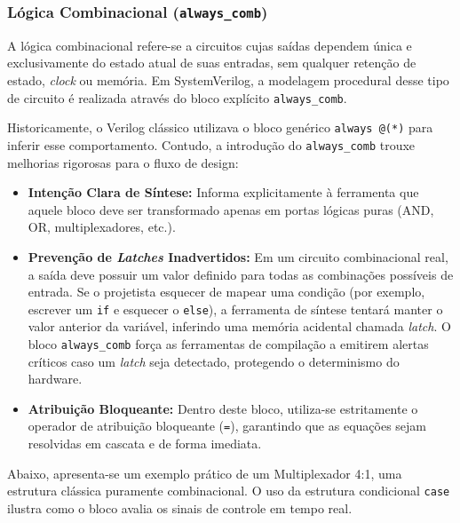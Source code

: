 \documentclass[12pt,a4paper]{article}
\begin{document}
\subsubsection{Lógica Combinacional (\texttt{always\_comb})}

A lógica combinacional refere-se a circuitos cujas saídas dependem única e exclusivamente do estado atual de suas entradas, sem qualquer retenção de estado, \textit{clock} ou memória. Em SystemVerilog, a modelagem procedural desse tipo de circuito é realizada através do bloco explícito \texttt{always\_comb}.

Historicamente, o Verilog clássico utilizava o bloco genérico \texttt{always @(*)} para inferir esse comportamento. Contudo, a introdução do \texttt{always\_comb} trouxe melhorias rigorosas para o fluxo de design:

\begin{itemize}
    \item \textbf{Intenção Clara de Síntese:} Informa explicitamente à ferramenta que aquele bloco deve ser transformado apenas em portas lógicas puras (AND, OR, multiplexadores, etc.).
    \item \textbf{Prevenção de \textit{Latches} Inadvertidos:} Em um circuito combinacional real, a saída deve possuir um valor definido para todas as combinações possíveis de entrada. Se o projetista esquecer de mapear uma condição (por exemplo, escrever um \texttt{if} e esquecer o \texttt{else}), a ferramenta de síntese tentará manter o valor anterior da variável, inferindo uma memória acidental chamada \textit{latch}. O bloco \texttt{always\_comb} força as ferramentas de compilação a emitirem alertas críticos caso um \textit{latch} seja detectado, protegendo o determinismo do hardware.
    \item \textbf{Atribuição Bloqueante:} Dentro deste bloco, utiliza-se estritamente o operador de atribuição bloqueante (\texttt{=}), garantindo que as equações sejam resolvidas em cascata e de forma imediata.
\end{itemize}

Abaixo, apresenta-se um exemplo prático de um Multiplexador 4:1, uma estrutura clássica puramente combinacional. O uso da estrutura condicional \texttt{case} ilustra como o bloco avalia os sinais de controle em tempo real.
\end{document}
